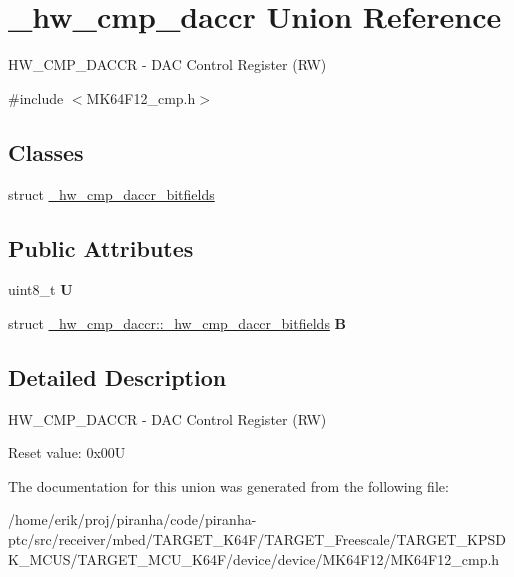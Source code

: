 \hypertarget{union__hw__cmp__daccr}{}\section{\+\_\+hw\+\_\+cmp\+\_\+daccr Union Reference}
\label{union__hw__cmp__daccr}


H\+W\+\_\+\+C\+M\+P\+\_\+\+D\+A\+C\+CR -\/ D\+AC Control Register (RW)  




{\ttfamily \#include $<$M\+K64\+F12\+\_\+cmp.\+h$>$}

\subsection*{Classes}
\begin{DoxyCompactItemize}
\item 
struct \hyperlink{struct__hw__cmp__daccr_1_1__hw__cmp__daccr__bitfields}{\+\_\+hw\+\_\+cmp\+\_\+daccr\+\_\+bitfields}
\end{DoxyCompactItemize}
\subsection*{Public Attributes}
\begin{DoxyCompactItemize}
\item 
uint8\+\_\+t {\bfseries U}\hypertarget{union__hw__cmp__daccr_aa7ca97fdcb11429372eff3c3c4d1ba2d}{}\label{union__hw__cmp__daccr_aa7ca97fdcb11429372eff3c3c4d1ba2d}

\item 
struct \hyperlink{struct__hw__cmp__daccr_1_1__hw__cmp__daccr__bitfields}{\+\_\+hw\+\_\+cmp\+\_\+daccr\+::\+\_\+hw\+\_\+cmp\+\_\+daccr\+\_\+bitfields} {\bfseries B}\hypertarget{union__hw__cmp__daccr_a066370db110f9fa9e8768e13dbd6e90e}{}\label{union__hw__cmp__daccr_a066370db110f9fa9e8768e13dbd6e90e}

\end{DoxyCompactItemize}


\subsection{Detailed Description}
H\+W\+\_\+\+C\+M\+P\+\_\+\+D\+A\+C\+CR -\/ D\+AC Control Register (RW) 

Reset value\+: 0x00U 

The documentation for this union was generated from the following file\+:\begin{DoxyCompactItemize}
\item 
/home/erik/proj/piranha/code/piranha-\/ptc/src/receiver/mbed/\+T\+A\+R\+G\+E\+T\+\_\+\+K64\+F/\+T\+A\+R\+G\+E\+T\+\_\+\+Freescale/\+T\+A\+R\+G\+E\+T\+\_\+\+K\+P\+S\+D\+K\+\_\+\+M\+C\+U\+S/\+T\+A\+R\+G\+E\+T\+\_\+\+M\+C\+U\+\_\+\+K64\+F/device/device/\+M\+K64\+F12/M\+K64\+F12\+\_\+cmp.\+h\end{DoxyCompactItemize}
